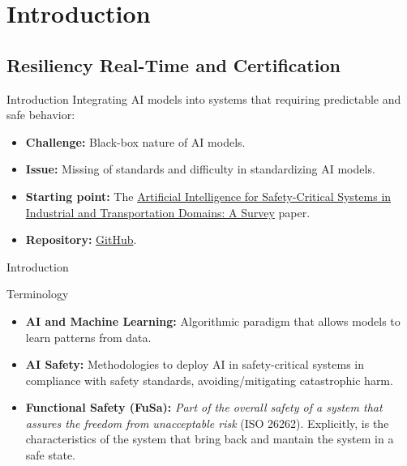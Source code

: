 \section{Introduction}

\subsection{Resiliency Real-Time and Certification}

\begin{frame}{Introduction}
    Integrating AI models into systems that requiring predictable and safe behavior:
    \begin{itemize}
        \item \textbf{Challenge:} Black-box nature of AI models.
        \item \textbf{Issue:} Missing of standards and difficulty in standardizing AI models.
        \item \textbf{Starting point:} The \href{https://dl.acm.org/doi/full/10.1145/3626314}{Artificial Intelligence for Safety-Critical Systems in Industrial and Transportation Domains: A Survey} paper.
        \item \textbf{Repository:} \href{https://github.com/edoardosarri24/AI-Safety-Critical-runtime-monitoring}{GitHub}.
    \end{itemize}
\end{frame}

\begin{frame}{Introduction}
    \begin{block}{Terminology}
        \begin{itemize}
            \item \textbf{AI and Machine Learning:} Algorithmic paradigm that allows models to learn patterns from data.
            \item \textbf{AI Safety:} Methodologies to deploy AI in safety-critical systems in compliance with safety standards, avoiding/mitigating catastrophic harm.
            \item \textbf{Functional Safety (FuSa):} \textit{Part of the overall safety of a system that assures the freedom from unacceptable risk} (ISO 26262). Explicitly, is the characteristics of the system that bring back and mantain the system in a safe state.
        \end{itemize}
    \end{block}
\end{frame}